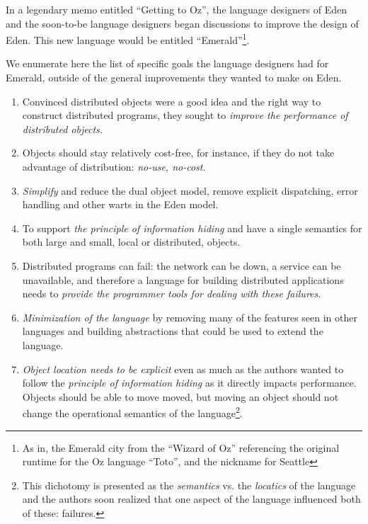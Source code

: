 In a legendary memo entitled ``Getting to Oz'', the language designers of Eden and the soon-to-be language designers began discussions to improve the design of Eden.  This new language would be entitled ``Emerald''\footnote{As in, the Emerald city from the ``Wizard of Oz'' referencing the original runtime for the Oz language ``Toto'', and the nickname for Seattle}.

We enumerate here the list of specific goals the language designers had for Emerald, outside of the general improvements they wanted to make on Eden.
\begin{enumerate}
\item Convinced distributed objects were a good idea and the right way to construct distributed programs, they sought to \textit{improve the performance of distributed objects.}
\item Objects should stay relatively cost-free, for instance, if they do not take advantage of distribution: \textit{no-use, no-cost}.
\item \textit{Simplify} and reduce the dual object model, remove explicit dispatching, error handling and other warts in the Eden model.
\item To support \textit{the principle of information hiding} and have a single semantics for both large and small, local or distributed, objects.
\item Distributed programs can fail: the network can be down, a service can be unavailable, and therefore a language for building distributed applications needs to \textit{provide the programmer tools for dealing with these failures.}
\item \textit{Minimization of the language} by removing many of the features seen in other languages and building abstractions that could be used to extend the language.
\item \textit{Object location needs to be explicit} even as much as the authors wanted to follow the \textit{principle of information hiding} as it directly impacts performance.  Objects should be able to move moved, but moving an object should not change the operational semantics of the language\footnote{This dichotomy is presented as the \textit{semantics} vs. the \textit{locatics} of the language and the authors soon realized that one aspect of the language influenced both of these: failures.}.
\end{enumerate}



